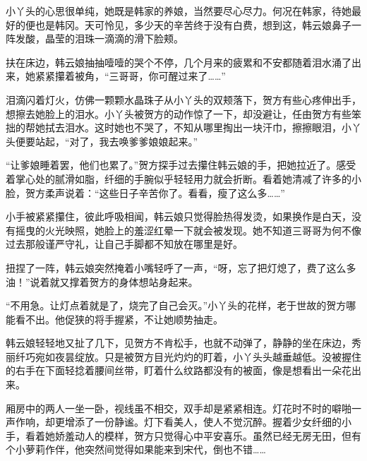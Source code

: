 小丫头的心思很单纯，她既是韩家的养娘，当然要尽心尽力。何况在韩家，待她最好的便也是韩冈。天可怜见，多少天的辛苦终于没有白费，想到这，韩云娘鼻子一阵发酸，晶莹的泪珠一滴滴的滑下脸颊。

扶在床边，韩云娘抽抽噎噎的哭个不停，几个月来的疲累和不安都随着泪水涌了出来，她紧紧攥着被角，“三哥哥，你可醒过来了……”

泪滴闪着灯火，仿佛一颗颗水晶珠子从小丫头的双颊落下，贺方有些心疼伸出手，想擦去她脸上的泪水。小丫头被贺方的动作惊了一下，却没避让，任由贺方有些笨拙的帮她拭去泪水。这时她也不哭了，不知从哪里掏出一块汗巾，擦擦眼泪，小丫头便要站起，“对了，我去唤爹爹娘娘起来。”

“让爹娘睡着罢，他们也累了。”贺方探手过去攥住韩云娘的手，把她拉近了。感受着掌心处的腻滑如脂，纤细的手腕似乎轻轻用力就会折断。看着她清减了许多的小脸，贺方柔声说着：“这些日子辛苦你了。看看，瘦了这么多……”

小手被紧紧攥住，彼此呼吸相闻，韩云娘只觉得脸热得发烫，如果换作是白天，没有摇曳的火光映照，她脸上的羞涩红晕一下就会被发现。她不知道三哥哥为何不像过去那般谨严守礼，让自己手脚都不知放在哪里是好。

扭捏了一阵，韩云娘突然掩着小嘴轻呼了一声，“呀，忘了把灯熄了，费了这么多油！”说着就又撑着贺方的身体想站身起来。

“不用急。让灯点着就是了，烧完了自己会灭。”小丫头的花样，老于世故的贺方哪能看不出。他促狭的将手握紧，不让她顺势抽走。

韩云娘轻轻地又扯了几下，见贺方不肯松手，也就不动弹了，静静的坐在床边，秀丽纤巧宛如夜昙绽放。只是被贺方目光灼灼的盯着，小丫头头越垂越低。没被握住的右手在下面轻捻着腰间丝带，盯着什么纹路都没有的被面，像是想看出一朵花出来。

厢房中的两人一坐一卧，视线虽不相交，双手却是紧紧相连。灯花时不时的噼啪一声作响，却更增添了一份静谧。灯下看美人，使人不觉沉醉。握着少女纤细的小手，看着她娇羞动人的模样，贺方只觉得心中平安喜乐。虽然已经无房无田，但有个小萝莉作伴，他突然间觉得如果能来到宋代，倒也不错……

